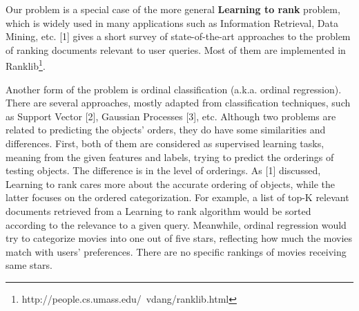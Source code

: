 Our problem is a special case of the more general \textbf{Learning to rank} problem, which is widely used in many applications such as Information Retrieval, Data Mining, etc. [1] gives a short survey of state-of-the-art approaches to the problem of ranking documents relevant to user queries. Most of them are implemented in Ranklib\footnote{http://people.cs.umass.edu/~vdang/ranklib.html}.

Another form of the problem is ordinal classification (a.k.a. ordinal regression). There are several approaches, mostly adapted from classification techniques, such as Support Vector [2], Gaussian Processes [3], etc. Although two problems are related to predicting the objects' orders, they do have some similarities and differences. First, both of them are considered as supervised learning tasks, meaning from the given features and labels, trying to predict the orderings of testing objects. The difference is in the level of orderings. As [1] discussed, Learning to rank cares more about the accurate ordering of objects, while the latter focuses on the ordered categorization. For example, a list of top-K relevant documents retrieved from a Learning to rank algorithm would be sorted according to the relevance to a given query. Meanwhile, ordinal regression would try to categorize movies into one out of five stars, reflecting how much the movies match with users' preferences. There are no specific rankings of movies receiving same stars.